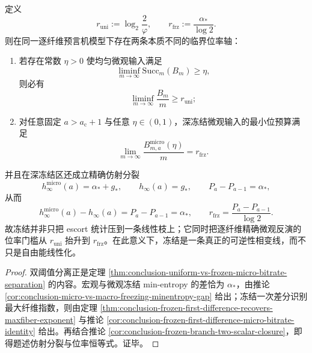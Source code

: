 \begin{theorem}\label{thm:conclusion-freezing-dual-bitrate-phase-transition}
定义
\[
r_{\mathrm{uni}}:=\log_2\frac{2}{\varphi},
\qquad
r_{\mathrm{frz}}:=\frac{\alpha_\ast}{\log 2}.
\]
则在同一逐纤维预言机模型下存在两条本质不同的临界位率轴：
\begin{enumerate}
  \item 若存在常数 \(\eta>0\) 使均匀微观输入满足
  \[
  \liminf_{m\to\infty}\mathrm{Succ}_m(B_m)\ge \eta,
  \]
  则必有
  \[
  \liminf_{m\to\infty}\frac{B_m}{m}\ge r_{\mathrm{uni}};
  \]
  \item 对任意固定 \(a>a_{\mathrm c}+1\) 与任意 \(\eta\in(0,1)\)，深冻结微观输入的最小位预算满足
  \[
  \lim_{m\to\infty}\frac{B_{m,a}^{\mathrm{micro}}(\eta)}{m}=r_{\mathrm{frz}}.
  \]
\end{enumerate}
并且在深冻结区还成立精确仿射分裂
\[
h_\infty^{\mathrm{micro}}(a)=\alpha_\ast+g_\ast,
\qquad
h_\infty(a)=g_\ast,
\qquad
P_a-P_{a-1}=\alpha_\ast,
\]
从而
\[
h_\infty^{\mathrm{micro}}(a)-h_\infty(a)=P_a-P_{a-1}=\alpha_\ast,
\qquad
r_{\mathrm{frz}}=\frac{P_a-P_{a-1}}{\log 2}.
\]
故冻结并非只把 escort 统计压到一条线性枝上；它同时把逐纤维精确微观反演的位率门槛从 \(r_{\mathrm{uni}}\) 抬升到 \(r_{\mathrm{frz}}\)。在此意义下，冻结是一条真正的可逆性相变线，而不只是自由能线性化。
\end{theorem}
\begin{proof}
双阈值分离正是定理 \ref{thm:conclusion-uniform-vs-frozen-micro-bitrate-separation} 的内容。宏观与微观冻结 min-entropy 的差恰为 \(\alpha_\ast\)，由推论 \ref{cor:conclusion-micro-vs-macro-freezing-minentropy-gap} 给出；冻结一次差分识别最大纤维指数，则由定理 \ref{thm:conclusion-frozen-first-difference-recovers-maxfiber-exponent} 与推论 \ref{cor:conclusion-frozen-first-difference-micro-bitrate-identity} 给出。再结合推论 \ref{cor:conclusion-frozen-branch-two-scalar-closure}，即得题述仿射分裂与位率恒等式。证毕。
\end{proof}

